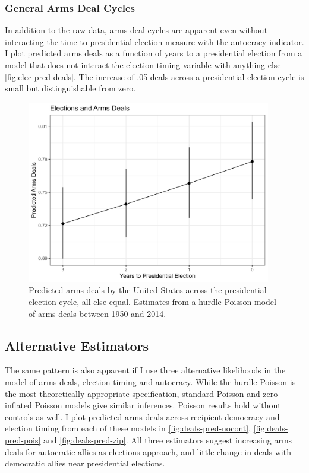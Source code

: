 \documentclass[12pt]{article}
\begin{document}
\subsubsection{General Arms Deal Cycles}

In addition to the raw data, arms deal cycles are apparent even without interacting the time to presidential election measure with the autocracy indicator.
I plot predicted arms deals as a function of years to a presidential election from a model that does not interact the election timing variable with anything else \autoref{fig:elec-pred-deals}. 
The increase of .05 deals across a presidential election cycle is small but distinguishable from zero. 


\begin{figure}[htpb]
	\centering
		\includegraphics[width=0.95\textwidth]{elec-pred-deals.png}
	\caption{Predicted arms deals by the United States across the presidential election cycle, all else equal. Estimates from a hurdle Poisson model of arms deals between 1950 and 2014. }
	\label{fig:elec-pred-deals}
\end{figure}



\subsection{Alternative Estimators}


The same pattern is also apparent if I use three alternative likelihoods in the model of arms deals, election timing and autocracy. 
While the hurdle Poisson is the most theoretically appropriate specification, standard Poisson and zero-inflated Poisson models give similar inferences.
Poisson results hold without controls as well.
I plot predicted arms deals across recipient democracy and election timing from each of these models in \autoref{fig:deals-pred-nocont}, \autoref{fig:deals-pred-pois} and \autoref{fig:deals-pred-zip}. 
All three estimators suggest increasing arms deals for autocratic allies as elections approach, and little change in deals with democratic allies near presidential elections. 
\end{document}
